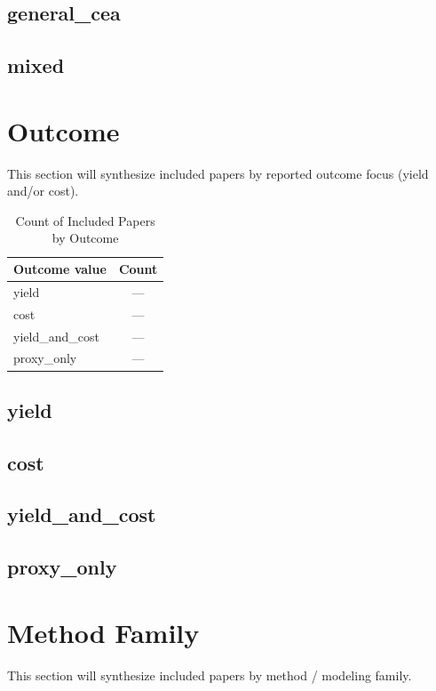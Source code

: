 \documentclass[lettersize,journal]{IEEEtran}
\begin{document}
\subsection{general\_cea}

\subsection{mixed}


\section{Outcome}
This section will synthesize included papers by reported outcome focus (yield and/or cost).

\begin{table}[H]
\caption{Count of Included Papers by Outcome}
\label{tab:outcome_counts}
\centering
\begin{tabular}{|l|c|}
\hline
Outcome value & Count\\
\hline
yield & ---\\
cost & ---\\
yield\_and\_cost & ---\\
proxy\_only & ---\\
\hline
\end{tabular}
\end{table}

\subsection{yield}

\subsection{cost}

\subsection{yield\_and\_cost}

\subsection{proxy\_only}


\section{Method Family}
This section will synthesize included papers by method / modeling family.
\end{document}

